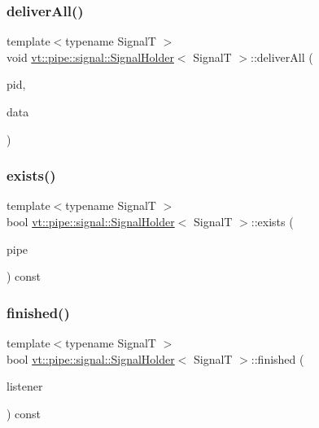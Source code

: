 \subsubsection{\texorpdfstring{deliver\+All()}{deliverAll()}}
{\footnotesize\ttfamily template$<$typename SignalT $>$ \\
void \hyperlink{structvt_1_1pipe_1_1signal_1_1_signal_holder}{vt\+::pipe\+::signal\+::\+Signal\+Holder}$<$ SignalT $>$\+::deliver\+All (\begin{DoxyParamCaption}\item[{\hyperlink{namespacevt_ac9852acda74d1896f48f406cd72c7bd3}{Pipe\+Type} const \&}]{pid,  }\item[{\hyperlink{structvt_1_1pipe_1_1signal_1_1_signal_holder_aad5bfc2b46dfa071ae638385324d7e31}{Data\+Ptr\+Type}}]{data }\end{DoxyParamCaption})}

\mbox{\label{structvt_1_1pipe_1_1signal_1_1_signal_holder_aeea971b494ab1e9bd716d4a127194ea3}} 
\subsubsection{\texorpdfstring{exists()}{exists()}}
{\footnotesize\ttfamily template$<$typename SignalT $>$ \\
bool \hyperlink{structvt_1_1pipe_1_1signal_1_1_signal_holder}{vt\+::pipe\+::signal\+::\+Signal\+Holder}$<$ SignalT $>$\+::exists (\begin{DoxyParamCaption}\item[{\hyperlink{namespacevt_ac9852acda74d1896f48f406cd72c7bd3}{Pipe\+Type} const \&}]{pipe }\end{DoxyParamCaption}) const}

\mbox{\label{structvt_1_1pipe_1_1signal_1_1_signal_holder_aa2d3f4de74295a26df20f26e84f99c4e}} 
\subsubsection{\texorpdfstring{finished()}{finished()}}
{\footnotesize\ttfamily template$<$typename SignalT $>$ \\
bool \hyperlink{structvt_1_1pipe_1_1signal_1_1_signal_holder}{vt\+::pipe\+::signal\+::\+Signal\+Holder}$<$ SignalT $>$\+::finished (\begin{DoxyParamCaption}\item[{\hyperlink{structvt_1_1pipe_1_1signal_1_1_signal_holder_a68114d1ad5804c71e014736b18e41e08}{Listener\+Ptr\+Type}}]{listener }\end{DoxyParamCaption}) const}

